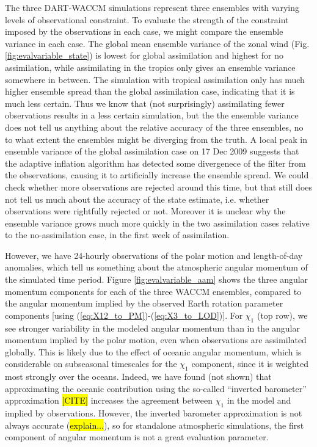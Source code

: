 The three DART-WACCM simulations represent three ensembles with varying levels of observational constraint. 
To evaluate the strength of the constraint imposed by the observations in each case, we might compare the ensemble variance in each case. 
The global mean ensemble variance of the zonal wind (Fig. \ref{fig:evalvariable_state}) 
is lowest for global assimilation and highest for no assimilation, while assimilating in the tropics only gives an ensemble variance somewhere in between.
The simulation with tropical assimilation only has much higher ensemble spread than the global assimilation case, indicating that it is much less certain. 
Thus we know that (not surprisingly) assimilating fewer observations results in a less certain simulation, but the the ensemble variance 
does not tell us anything about the relative accuracy of the three ensembles, no to what extent the ensembles might be diverging from the truth. 
A local peak in ensemble variance of the global assimilation case on 17 Dec 2009 suggests that the adaptive inflation algorithm has detected some divergenece of the filter from the observations, causing it to artificially increase the ensemble spread. 
We could check whether more observations are rejected around this time, but that still does not tell us much about the accuracy of the state estimate, i.e. whether observations were rightfully rejected or not. 
Moreover it is unclear why the ensemble variance grows much more quickly in the two assimilation cases relative to the no-assimilation case, in the first week of assimilation. 

However, we have 24-hourly observations of the polar motion and length-of-day anomalies, which tell us something about 
the atmospheric angular momentum of the simulated time period. 
Figure \ref{fig:evalvariable_aam} shows the three angular momentum components for each of the three WACCM ensembles, compared to the angular momentum implied by the observed Earth rotation parameter components [using (\ref{eq:X12_to_PM})-(\ref{eq:X3_to_LOD})]. 
For $\chi_1$ (top row), we see stronger variability in the modeled angular momentum than in the angular momentum implied by the polar motion, even when observations are assimilated globally. 
This is likely due to the effect of oceanic angular momentum, which is considerable on subseasonal timescales for the $\chi_1$ component, since it is weighted most strongly over the oceans. 
Indeed, we have found (not shown) that approximating the oceanic contribution using the so-called ``inverted barometer'' approximation \hl{[CITE]} increases the agreement between $\chi_1$ in the model and implied by observations. 
However, the inverted barometer approximation is not always accurate (\hl{explain...}), so for standalone atmospheric simulations, the first component of angular momentum is not a great evaluation parameter. 

